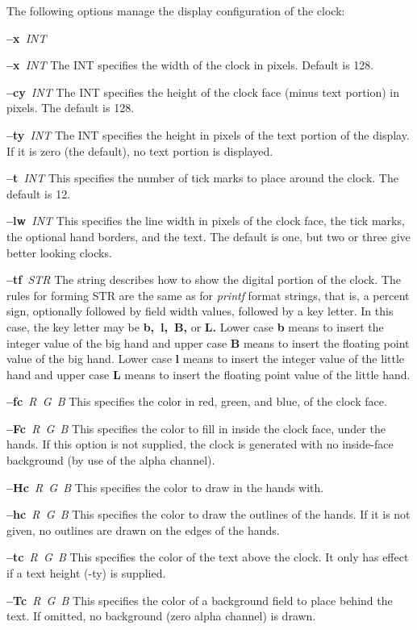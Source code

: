 The following options manage the display configuration of the clock:
\begin{TPlist}{{\bf --x}{\it \ INT}
}
\item[{{\bf --x}{\it \ INT}
}]
The INT specifies the width of the clock in pixels.
Default is 128.
\item[{{\bf --cy}{\it \ INT}
}]
The INT specifies the height of the clock face (minus text portion) in pixels.
The default is 128.
\item[{{\bf --ty}{\it \ INT}
}]
The INT specifies the height in pixels of the text portion of the display.
If it is zero (the default), no text portion is displayed.
\item[{{\bf --t}{\it \ INT}
}]
This specifies the number of tick marks to place around the clock.
The default is 12.
\item[{{\bf --lw}{\it \ INT}
}]
This specifies the line width in pixels of the clock face, the tick marks, the
optional hand borders, and the text.
The default is one, but two or three give better looking clocks.
\item[{{\bf --tf}{\it \ STR}
}]
The string describes how to show the digital portion of the clock.
The rules for forming STR are the same as for
{\it printf}
format strings, that is, a percent sign, optionally followed by field width
values, followed by a key letter.
In this case, the key letter may be
{\bf b,\ l,\ B,}
or
{\bf L.}
Lower case
{\bf b}
means to insert the integer value of the big hand and upper case
{\bf B}
means to insert the floating point value of the big hand.
Lower case
{\bf l}
means to insert the integer value of the little hand and upper case
{\bf L}
means to insert the floating point value of the little hand.
\item[{{\bf --fc}{\it \ R\ G\ B}
}]
This specifies the color in red, green, and blue, of the clock face.
\item[{{\bf --Fc}{\it \ R\ G\ B}
}]
This specifies the color to fill in inside the clock face, under the hands.  If
this option is not supplied, the clock is generated with no inside-face
background (by use of the alpha channel).
\item[{{\bf --Hc}{\it \ R\ G\ B}
}]
This specifies the color to draw in the hands with.
\item[{{\bf --hc}{\it \ R\ G\ B}
}]
This specifies the color to draw the outlines of the hands.
If it is not given, no outlines are drawn on the edges of the hands.
\item[{{\bf --tc}{\it \ R\ G\ B}
}]
This specifies the color of the text above the clock.
It only has effect if a text height (-ty) is supplied.
\item[{{\bf --Tc}{\it \ R\ G\ B}
}]
This specifies the color of a background field to place behind the text.
If omitted, no background (zero alpha channel) is drawn.
\end{TPlist}
